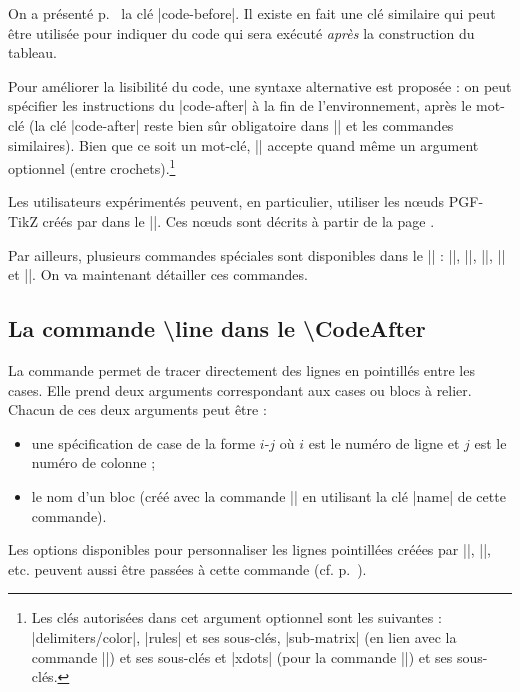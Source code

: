 \documentclass[dvipsnames]{article}%
\begin{document}

\label{code-after}
On a présenté p.~\pageref{code-before} la clé |code-before|. Il existe en fait
une clé similaire  qui peut être utilisée pour indiquer
du code qui sera exécuté \emph{après} la construction du tableau.

\medskip
{}
Pour améliorer la lisibilité du code, une syntaxe alternative est proposée : on
peut spécifier les instructions du |code-after| à la fin de l'environnement,
après le mot-clé  (la clé |code-after| reste bien
sûr obligatoire dans |\AutoNiceMatrix| et les commandes similaires). Bien que ce
soit un mot-clé, |\CodeAfter| accepte quand même un argument optionnel (entre
crochets).\footnote{Les clés autorisées dans cet argument optionnel sont les
  suivantes : |delimiters/color|, |rules| et ses sous-clés, |sub-matrix| (en
  lien avec la commande |\SubMatrix|) et ses sous-clés et |xdots| (pour la
  commande |\line|) et ses sous-clés.} 


\medskip
Les utilisateurs expérimentés peuvent, en particulier, utiliser les nœuds
PGF-TikZ créés par  dans le |\CodeAfter|. Ces nœuds sont décrits
à partir de la page \pageref{PGF-nodes}.

\medskip
Par ailleurs, plusieurs commandes spéciales sont disponibles dans le
|\CodeAfter| : |\line|, |\SubMatrix|, |\OverBrace|, |\UnderBrace| et
|\TikzEveryCell|. On va maintenant détailler ces commandes.


\subsection{La commande \textbackslash line dans le \textbackslash CodeAfter}

\label{line-in-code-after}
La commande  permet de tracer directement des lignes en
pointillés entre les cases. Elle prend deux arguments correspondant aux cases ou
blocs à relier. Chacun de ces deux arguments peut être :
\begin{itemize}
\item une spécification de case de la forme $i$-$j$ où $i$ est le numéro de
ligne et $j$ est le numéro de colonne ; 
\item le nom d'un bloc (créé avec la commande |\Block| en utilisant la clé
|name| de cette commande).
\end{itemize}
 Les options disponibles pour personnaliser les lignes pointillées créées par
|\Cdots|, |\Vdots|, etc. peuvent aussi être passées à cette commande (cf.
p.~\pageref{customization}).
\end{document}
